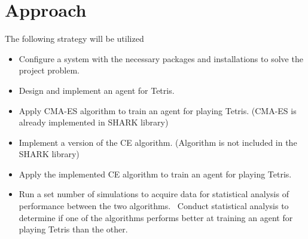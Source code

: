\section*{Approach}
The following strategy will be utilized
\begin{itemize}
\item Configure a system with the necessary packages and installations to solve the project problem.
\item Design and implement an agent for Tetris. 
\item Apply CMA-ES algorithm to train an agent for playing Tetris. (CMA-ES is already implemented in SHARK library)
\item Implement a version of the CE algorithm. (Algorithm is not included in the SHARK library)
\item Apply the implemented CE algorithm to train an agent for playing Tetris.
\item Run a set number of simulations to acquire data for statistical analysis of performance between the two algorithms.
\ Conduct statistical analysis to determine if one of the algorithms performs better at training an agent for playing Tetris than the other.
\end{itemize}